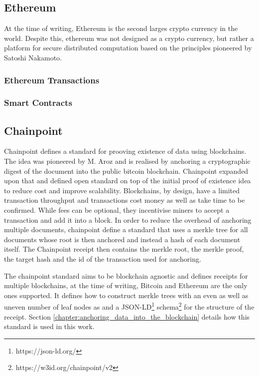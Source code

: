 \documentclass[12pt,msc,a4paper,oneside]{ucl_thesis}
\begin{document}
\subsection{Ethereum} \label{sec:background_ethereum}
At the time of writing, Ethereum is the second larges crypto currency in the world. Despite this, ethereum was not designed as a crypto currency, but rather a platform for secure distributed computation based on the principles pioneered by Satoshi Nakamoto.
\subsubsection{Ethereum Transactions}
\subsubsection{Smart Contracts}

\subsection{Chainpoint} \label{sec:literature_chainpoint}
Chainpoint defines a standard for prooving existence of data using blockchains. The idea was pioneered by M. Aroz \cite{proof_of_existence} and is realised by anchoring a cryptographic digest of the document into the public bitcoin blockchain. Chainpoint expanded upon that and defined open standard on top of the initial proof of existence idea to reduce cost and improve scalability.
Blockchains, by design, have a limited transaction throughput and transactions cost money as well as take time to be confirmed. While fees can be optional, they incentivise miners to accept a transaction and add it into a block. In order to reduce the overhead of anchoring multiple documents, chainpoint define a standard that uses a merkle tree for all documents whose root is then anchored and instead a hash of each document itself. The Chainpoint receipt then contains the merkle root, the merkle proof, the target hash and the id of the transaction used for anchoring.

The chainpoint standard aims to be blockchain agnostic and defines receipts for multiple blockchains, at the time of writing, Bitcoin and Ethereum are the only ones supported. It defines how to construct merkle trees with an even as well as uneven number of leaf nodes as and a JSON-LD\footnote{https://json-ld.org/} schema\footnote{https://w3id.org/chainpoint/v2} for the structure of the receipt. Section \ref{chapter:anchoring_data_into_the_blockchain} details how this standard is used in this work.
\end{document}
